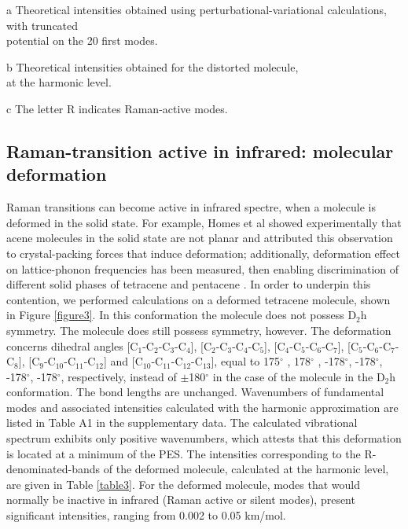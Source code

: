 \begin{table}[H]
\begin{center}
\begin{threeparttable}[b]
  			\begin{tablenotes}
  					\item[a] Theoretical intensities obtained using perturbational-variational calculations, with truncated \\ potential on the 20 first modes.
  					\item[b] Theoretical intensities obtained for the distorted molecule,\\ at the harmonic level.
  					\item[c] The letter R indicates Raman-active modes.
  			\end{tablenotes}
  			\end{threeparttable}
  	\end{center}
  	\label{table4}
  \end{table}


\subsection*{Raman-transition active in infrared: molecular deformation}

Raman transitions can become active in infrared spectre, when a molecule is deformed in the solid state. For example, Homes et al\cite{holmes1999nature} showed experimentally that acene molecules in the solid state are not planar and attributed this observation to crystal-packing forces that induce deformation; additionally, deformation effect on lattice-phonon frequencies has been measured, then enabling discrimination of different solid phases of tetracene \cite{venuti2004phonons} and pentacene \cite{venuti2002probing,brillante2002raman}. 
In order to underpin this contention, we performed calculations on a deformed tetracene molecule, shown in Figure \ref{figure3}. In this conformation the molecule does not possess D$_{2}$h symmetry. The molecule does still possess symmetry, however. The deformation concerns dihedral angles [C$_{1}$-C$_{2}$-C$_{3}$-C$_{4}$], [C$_{2}$-C$_{3}$-C$_{4}$-C$_{5}$], [C$_{4}$-C$_{5}$-C$_{6}$-C$_{7}$], [C$_{5}$-C$_{6}$-C$_{7}$-C$_{8}$], [C$_{9}$-C$_{10}$-C$_{11}$-C$_{12}$] and [C$_{10}$-C$_{11}$-C$_{12}$-C$_{13}$], equal to 175$^{\circ}$ , 178$^{\circ}$ , -178$^{\circ}$, -178$^{\circ}$, -178$^{\circ}$, -178$^{\circ}$, respectively, instead of $\pm$180$^{\circ}$ in the case of the molecule in the D$_{2}$h conformation. The bond lengths are unchanged. Wavenumbers of fundamental modes and associated intensities calculated with the harmonic approximation are listed in Table A1 in the supplementary data. The calculated vibrational spectrum exhibits only positive wavenumbers, which attests that this deformation is located at a minimum of the PES. The intensities corresponding to the R-denominated-bands of the deformed molecule, calculated at the harmonic level, are given in Table \ref{table3}. For the deformed molecule, modes that would normally be inactive in infrared (Raman active or silent modes), present significant intensities, ranging from 0.002 to 0.05 km/mol.

